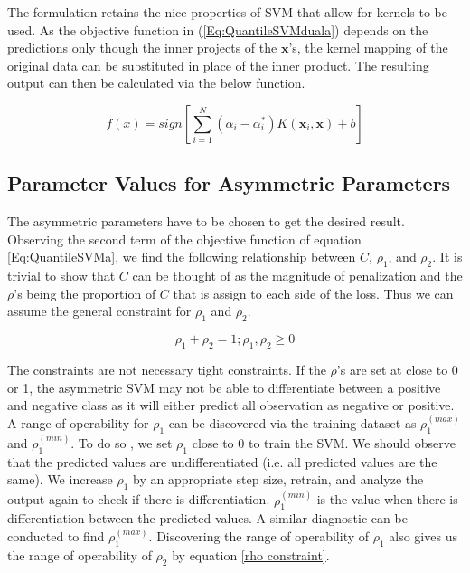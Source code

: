 \documentclass[twoside,11pt]{article}
\begin{document}
The formulation retains the nice properties of SVM that allow for kernels to be used. As the objective function in (\ref{Eq:QuantileSVMduala}) depends on the predictions only though the inner projects of the $\mathbf{x}$'s, the kernel mapping of the original data can be substituted in place of the inner product. The resulting output can then be calculated via the below function. 

\begin{equation}\label{finalpredictioneqn2}
f(x)=sign[\displaystyle\sum_{i=1}^N (\alpha_i - \alpha_i^*)K(\mathbf{x}_i,\mathbf{x})+b]
\end{equation}

\subsection{Parameter Values for Asymmetric Parameters}
The asymmetric parameters have to be chosen to get the desired result. Observing the second term of the objective function of equation \ref{Eq:QuantileSVMa}, we find the following relationship between $C$, $\rho_1$, and $\rho_2$. It is trivial to show that $C$ can be thought of as the magnitude of penalization and the $\rho$'s being the proportion of $C$ that is assign to each side of the loss. Thus we can assume the general constraint for $\rho_1$ and $\rho_2$.

\begin{equation}\label{rho constraint}
\rho_1 + \rho_2 =1; \rho_1,\rho_2 \geq 0
\end{equation}

The constraints are not necessary tight constraints. If the $\rho$'s are set at close to 0 or 1, the asymmetric SVM may not be able to differentiate between a positive and negative class as it will either predict all observation as negative or positive. A range of operability for $\rho_1$ can be discovered via the training dataset as $\rho_1^{(max)}$ and $\rho_1^{(min)}$. To do so , we set $\rho_1$ close to 0 to train the SVM. We should observe that the predicted values are undifferentiated (i.e. all predicted values are the same). We increase $\rho_1$ by an appropriate step size, retrain, and analyze the output again to check if there is differentiation. $\rho_1^{(min)}$ is the value when there is differentiation between the predicted values. A similar diagnostic can be conducted to find $\rho_1^{(max)}$. Discovering the range of operability of $\rho_1$ also gives us the range of operability of $\rho_2$ by equation \ref{rho constraint}.
\end{document}
